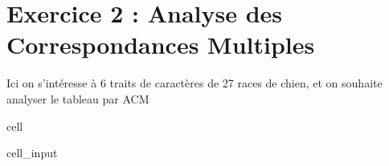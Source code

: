 \documentclass[letterpaper,10pt,french]{sphinxmanual}
\begin{document}
\chapter{Exercice 2 : Analyse des Correspondances Multiples}
\label{\detokenize{TP3_AFC_ACM:exercice-2-analyse-des-correspondances-multiples}}
\sphinxAtStartPar
Ici on s’intéresse à 6 traits de caractères de 27 races de chien, et on souhaite analyser le tableau par ACM

\begin{sphinxuseclass}{cell}
\begin{sphinxuseclass}{cell_input}
\begin{sphinxVerbatim}[commandchars=\\\{\}]
      
\end{sphinxVerbatim}


\end{sphinxuseclass}
\end{sphinxuseclass}
\end{document}
